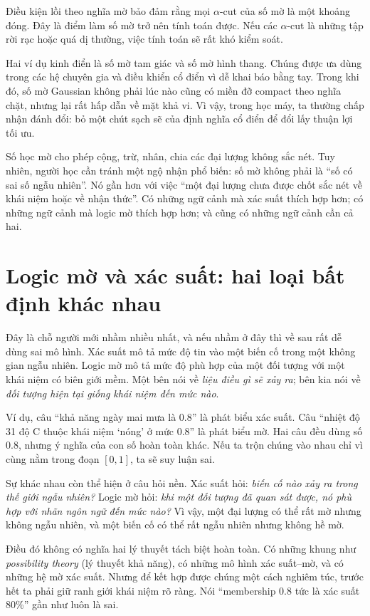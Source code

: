 Điều kiện lồi theo nghĩa mờ bảo đảm rằng mọi \(\alpha\)-cut của số mờ là một khoảng đóng. Đây là điểm làm số mờ trở nên tính toán được. Nếu các \(\alpha\)-cut là những tập rời rạc hoặc quá dị thường, việc tính toán sẽ rất khó kiểm soát.

Hai ví dụ kinh điển là số mờ tam giác và số mờ hình thang. Chúng được ưa dùng trong các hệ chuyên gia và điều khiển cổ điển vì dễ khai báo bằng tay. Trong khi đó, số mờ Gaussian không phải lúc nào cũng có miền đỡ compact theo nghĩa chặt, nhưng lại rất hấp dẫn về mặt khả vi. Vì vậy, trong học máy, ta thường chấp nhận đánh đổi: bỏ một chút sạch sẽ của định nghĩa cổ điển để đổi lấy thuận lợi tối ưu.

Số học mờ cho phép cộng, trừ, nhân, chia các đại lượng không sắc nét. Tuy nhiên, người học cần tránh một ngộ nhận phổ biến: số mờ không phải là ``số có sai số ngẫu nhiên''. Nó gần hơn với việc ``một đại lượng chưa được chốt sắc nét về khái niệm hoặc về nhận thức''. Có những ngữ cảnh mà xác suất thích hợp hơn; có những ngữ cảnh mà logic mờ thích hợp hơn; và cũng có những ngữ cảnh cần cả hai.

\section{Logic mờ và xác suất: hai loại bất định khác nhau}

Đây là chỗ người mới nhầm nhiều nhất, và nếu nhầm ở đây thì về sau rất dễ dùng sai mô hình. Xác suất mô tả mức độ tin vào một biến cố trong một không gian ngẫu nhiên. Logic mờ mô tả mức độ phù hợp của một đối tượng với một khái niệm có biên giới mềm. Một bên nói về \emph{liệu điều gì sẽ xảy ra}; bên kia nói về \emph{đối tượng hiện tại giống khái niệm đến mức nào}.

Ví dụ, câu ``khả năng ngày mai mưa là 0.8'' là phát biểu xác suất. Câu ``nhiệt độ 31 độ C thuộc khái niệm `nóng' ở mức 0.8'' là phát biểu mờ. Hai câu đều dùng số 0.8, nhưng ý nghĩa của con số hoàn toàn khác. Nếu ta trộn chúng vào nhau chỉ vì cùng nằm trong đoạn \([0,1]\), ta sẽ suy luận sai.

Sự khác nhau còn thể hiện ở câu hỏi nền. Xác suất hỏi: \emph{biến cố nào xảy ra trong thế giới ngẫu nhiên?} Logic mờ hỏi: \emph{khi một đối tượng đã quan sát được, nó phù hợp với nhãn ngôn ngữ đến mức nào?} Vì vậy, một đại lượng có thể rất mờ nhưng không ngẫu nhiên, và một biến cố có thể rất ngẫu nhiên nhưng không hề mờ.

Điều đó không có nghĩa hai lý thuyết tách biệt hoàn toàn. Có những khung như \emph{possibility theory} (lý thuyết khả năng), có những mô hình xác suất--mờ, và có những hệ mờ xác suất. Nhưng để kết hợp được chúng một cách nghiêm túc, trước hết ta phải giữ ranh giới khái niệm rõ ràng. Nói ``membership 0.8 tức là xác suất 80\%'' gần như luôn là sai.

